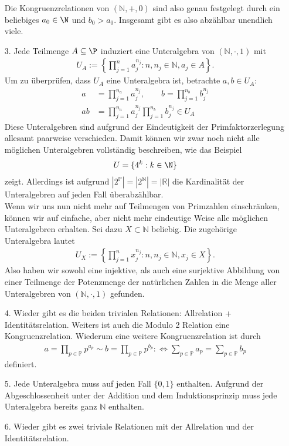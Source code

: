 \begin{solution}
\begin{itemize}
Die Kongruenzrelationen von $(\mathbb{N},+,0)$ sind also genau festgelegt durch ein beliebiges $a_0 \in \N$ und $b_0 > a_0$.
Insgesamt gibt es also abzählbar unendlich viele.
\item [3.] Jede Teilmenge $A \subseteq \P$ induziert eine
Unteralgebra von $(\mathbb{N},\cdot,1)$ mit
\begin{align*}
  U_A := \left\{\prod_{j=1}^na_j^{n_j}: n, n_j \in \mathbb{N}, a_j \in A\right\}.
\end{align*}
Um zu überprüfen, dass $U_A$ eine Unteralgebra ist, betrachte $a, b \in U_A$:
\begin{align*}
  a &= \prod_{j=1}^{n_a}a_j^{n_j}, \qquad b = \prod_{j=1}^{n_b}b_j^{n_j} \\
  ab &= \prod_{j=1}^{n_a}a_j^{n_j}\prod_{j=1}^{n_b}b_j^{n_j} \in U_A
\end{align*}
Diese Unteralgebren sind aufgrund der Eindeutigkeit
der Primfaktorzerlegung allesamt paarweise verschieden.
Damit können wir zwar noch nicht alle möglichen Unteralgebren
vollständig beschreiben, wie das Beispiel
\begin{align*}
  U = \{4^k: k \in \N\}
\end{align*} zeigt.
Allerdings ist aufgrund $|2^\mathbb{P}| = |2^\mathbb{N}|
= |\mathbb{R}|$ die Kardinalität der Unteralgebren auf jeden
Fall überabzählbar. \\
Wenn wir uns nun nicht mehr auf Teilmengen von Primzahlen einschränken,
können wir auf einfache, aber nicht mehr eindeutige Weise alle möglichen Unteralgebren
erhalten. Sei dazu $X \subset \mathbb{N}$ beliebig. Die zugehörige Unteralgebra lautet
\begin{align*}
  U_X := \left\{\prod_{j=1}^nx_j^{n_j}: n, n_j \in \mathbb{N}, x_j \in X\right\}.
\end{align*}
Also haben wir sowohl eine injektive, als auch eine surjektive Abbildung von
einer Teilmenge der Potenzmenge der natürlichen Zahlen in die Menge aller
Unteralgebren von $(\mathbb{N},\cdot,1)$ gefunden. \\
\item [4.] Wieder gibt es die beiden trivialen Relationen: Allrelation + Identitätsrelation.
Weiters ist auch die Modulo 2 Relation eine Kongruenzrelation.
Wiederum eine weitere Kongruenzrelation ist durch
\begin{align*}
  a = \prod_{p \in \mathbb{P}}p^{a_p} \sim b = \prod_{p \in \mathbb{P}}p^{b_p}: \iff \sum_{p \in \mathbb{P}} a_p = \sum_{p \in \mathbb{P}} b_p
\end{align*}
definiert.
\item [5.] Jede Unteralgebra muss auf jeden Fall $\{0,1\}$ enthalten. Aufgrund
der Abgeschlossenheit unter der Addition und dem Induktionsprinzip
muss jede Unteralgebra bereits ganz $\mathbb{N}$ enthalten.
\item [6.] Wieder gibt es zwei triviale Relationen mit der Allrelation und der
Identitätsrelation.


\end{itemize}
\end{solution}
